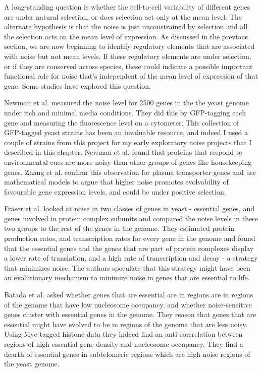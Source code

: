 A long-standing question is whether the cell-to-cell variability of different genes are under natural selection, or does selection act only at the mean level. The alternate hypothesis is that the noise is just unconstrained by selection and all the selection acts on the mean level of expression. As discussed in the previous section, we are now beginning to identify regulatory elements that are associated with noise but not mean levels. If these regulatory elements are under selection, or if they are conserved across species, these could indicate a possible important functional role for noise that's independent of the mean level of expression of that gene. Some studies have explored this question.

Newman et al. \cite{newman2006na} measured the noise level for 2500 genes in the the yeast genome under rich and minimal media conditions. They did this by GFP-tagging each gene and measuring the fluorescence level on a cytometer. This collection of GFP-tagged yeast strains has been an invaluable resource, and indeed I used a couple of strains from this project for my early exploratory noise projects that I described in this chapter. Newman et al. found that proteins that respond to environmental cues are more noisy than other groups of genes like housekeeping genes. Zhang et al. \cite{zhang2009msb} confirm this observation for plasma transporter genes and use mathematical models to argue that higher noise promotes evolvability of favourable gene expression levels, and could be under positive selection. 

Fraser et al. \cite{fraser2004pb} looked at noise in two classes of genes in yeast - essential genes, and genes involved in protein complex subunits and compared the noise levels in these two groups to the rest of the genes in the genome. They estimated protein production rates, and transcription rates for every gene in the genome and found that the essential genes and the genes that are part of protein complexes display a lower rate of translation, and a high rate of transcription and decay - a strategy that minimizes noise. The authors speculate that this strategy might have been an evolutionary mechanism to minimize noise in genes that are essential to life.

Batada et al. \cite{batada2007ng} asked whether genes that are essential are in regions are in regions of the genome that have low nucleosome occupancy, and whether noise-sensitive genes cluster with essential genes in the genome. They reason that genes that are essential might have evolved to be in regions of the genome that are less noisy. Using Myc-tagged histone data they indeed find an anti-corrrelation between regions of high essential gene density and nucleosome occupancy. They find a dearth of essential genes in subtelomeric regions which are high noise regions of the yeast genome.

